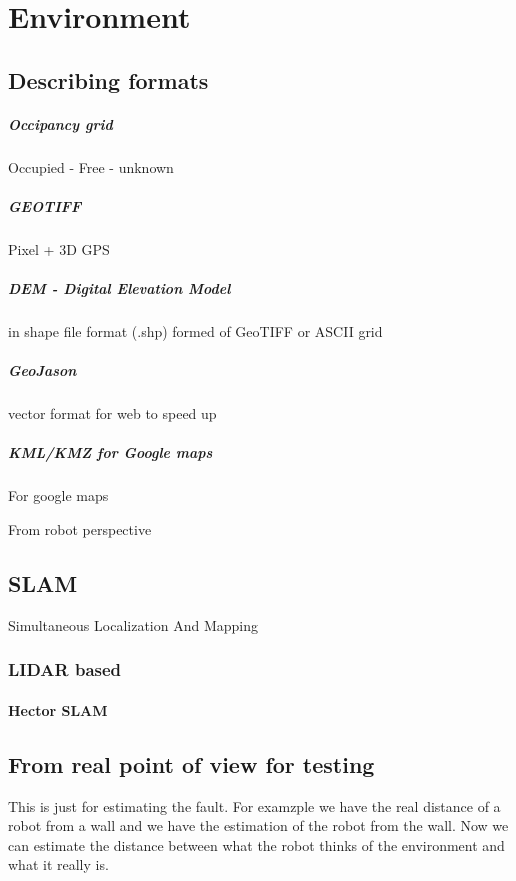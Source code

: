 \chapter{Environment}

\section{Describing formats}
    \paragraph{Occipancy grid}
        Occupied - Free  - unknown
    
    
    \paragraph{GEOTIFF}
        Pixel + 3D GPS
        
    \paragraph{DEM - Digital Elevation Model}
        in shape file format (.shp) formed of GeoTIFF or ASCII grid
        
    \paragraph{GeoJason}
        vector format for web to speed up
        
    \paragraph{KML/KMZ for Google maps}
        For google maps


From robot perspective
\section{SLAM}
    Simultaneous Localization And Mapping
    \subsection{LIDAR based}
        \subsubsection{Hector SLAM}
    \subsection{}

\section{From real point of view for testing}
    This is just for estimating the fault. For examzple we have the real distance of a robot from a wall and we have the estimation of the robot from the wall. Now we can estimate the distance between what the robot thinks of the environment and what it really is.